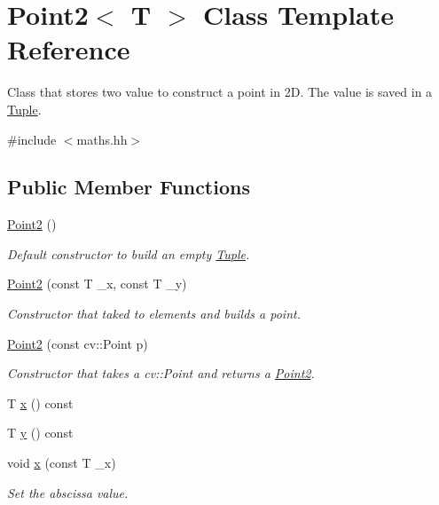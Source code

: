 \hypertarget{class_point2}{}\section{Point2$<$ T $>$ Class Template Reference}
\label{class_point2}


Class that stores two value to construct a point in 2D. The value is saved in a \mbox{\hyperlink{class_tuple}{Tuple}}.  




{\ttfamily \#include $<$maths.\+hh$>$}

\subsection*{Public Member Functions}
\begin{DoxyCompactItemize}
\item 
\mbox{\hyperlink{class_point2_a4674f9e2fab693fc83afd5af234100d3}{Point2}} ()
\begin{DoxyCompactList}\small\item\em Default constructor to build an empty \mbox{\hyperlink{class_tuple}{Tuple}}. \end{DoxyCompactList}\item 
\mbox{\hyperlink{class_point2_ae743063a4348bef19448aabf90901cb3}{Point2}} (const T \+\_\+x, const T \+\_\+y)
\begin{DoxyCompactList}\small\item\em Constructor that taked to elements and builds a point. \end{DoxyCompactList}\item 
\mbox{\hyperlink{class_point2_a436478e578e6c7df9ea1bf1136ad8764}{Point2}} (const cv\+::\+Point p)
\begin{DoxyCompactList}\small\item\em Constructor that takes a cv\+::\+Point and returns a \mbox{\hyperlink{class_point2}{Point2}}. \end{DoxyCompactList}\item 
T \mbox{\hyperlink{class_point2_adbf149d6f50de0d91c714a3fc45a80c5}{x}} () const
\item 
T \mbox{\hyperlink{class_point2_ad7138ca15abc7937b9b1fdb0a84d229c}{y}} () const
\item 
void \mbox{\hyperlink{class_point2_a0693b1a0d34cb1dd3a4d30ea078a4d5e}{x}} (const T \+\_\+x)
\begin{DoxyCompactList}\small\item\em Set the abscissa value. \end{DoxyCompactList}\item 

\end{DoxyCompactItemize}
